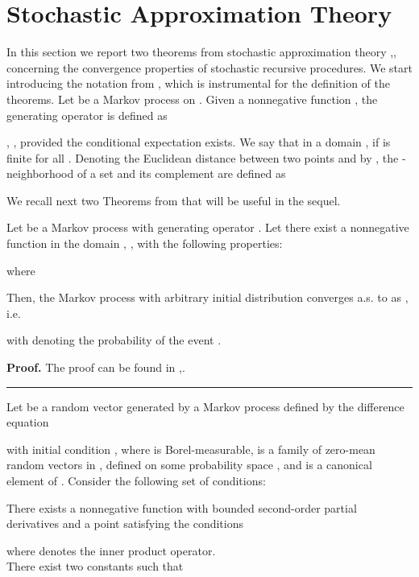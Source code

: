 \documentclass[10pt,twocolumn]{IEEEtran}
\newenvironment{proof}[1][Proof]{\noindent \textbf{#1.} }{\qedsymbol}
\newcommand{\qedsymbol}{\hspace{\fill}\rule{1.5ex}{1.5ex}}
\begin{document}
\appendices



\section{Stochastic Approximation Theory}

In this section we report two theorems from stochastic approximation theory \cite{Nevel},\cite{Kar-Moura}, concerning the convergence properties of stochastic recursive procedures. We start introducing the notation from \cite{Nevel}, which is instrumental for the definition of the theorems. Let  be a Markov process on . Given  a nonnegative function
, the generating operator  is defined as

, , provided the conditional expectation exists. We say that  in a domain , if  is finite for all . Denoting the Euclidean distance between two points  and  by , the -neighborhood of a set  and its complement are defined as


We recall next two Theorems from \cite{Nevel} that will be useful in the sequel.

 Let  be a Markov process with generating operator . Let there exist a nonnegative function  in the domain , , with the following properties:

where

Then, the Markov process  with arbitrary initial distribution converges a.s. to  as , i.e.

with  denoting the probability of the event .

\begin{proof}
The proof can be found in \cite{Nevel},\cite{Kar-Moura}.
\end{proof}


Let  be a random vector generated by a Markov process defined by the difference equation

with initial condition , where  is Borel-measurable,
 is a family of zero-mean random vectors in , defined on some probability space , and  is a canonical element of .
Consider the following set of conditions:

 There exists a nonnegative function  with bounded second-order partial derivatives and a point  satisfying the conditions

where  denotes the inner product operator.\\
 There exist two constants  such that
\end{document}
